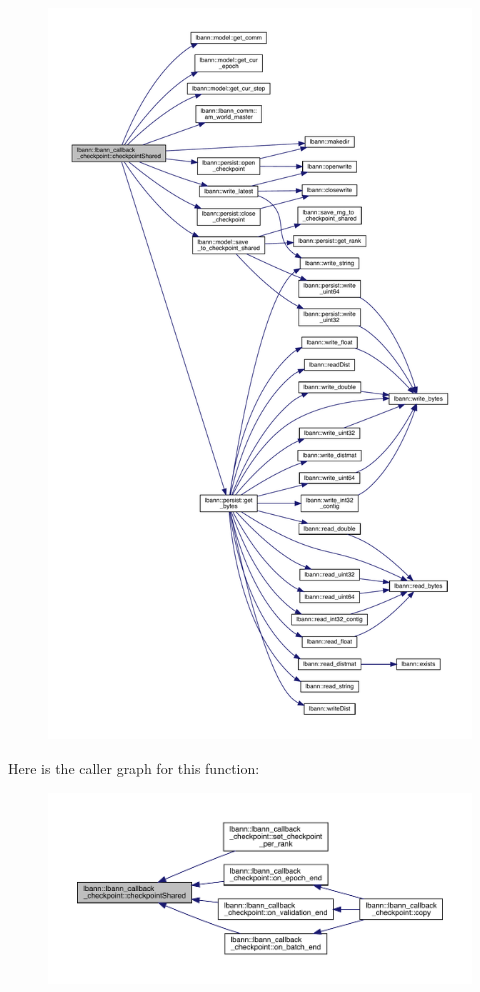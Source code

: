 \begin{figure}[H]
\begin{center}
\leavevmode
\includegraphics[height=550pt]{classlbann_1_1lbann__callback__checkpoint_a23b6f5abb924b2c4d0694e98c7d6f4d5_cgraph}
\end{center}
\end{figure}
Here is the caller graph for this function\+:\nopagebreak
\begin{figure}[H]
\begin{center}
\leavevmode
\includegraphics[width=350pt]{classlbann_1_1lbann__callback__checkpoint_a23b6f5abb924b2c4d0694e98c7d6f4d5_icgraph}
\end{center}
\end{figure}
